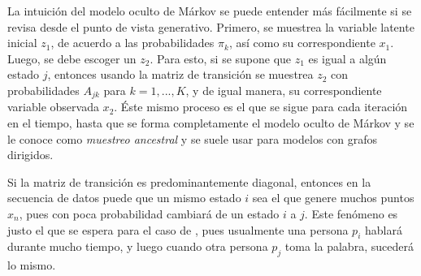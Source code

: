 La intuición del modelo oculto de Márkov se puede entender más fácilmente si se revisa desde el punto de vista generativo. Primero, se muestrea la variable latente inicial $z_1$, de acuerdo a las probabilidades $\pi_k$, así como su correspondiente $x_1$. Luego, se debe escoger un $z_2$. Para esto, si se supone que $z_1$ es igual a algún estado $j$, entonces usando la matriz de transición se muestrea $z_2$ con probabilidades $A_{jk}$ para $k = 1, ..., K$, y de igual manera, su correspondiente variable observada $x_2$. Éste mismo proceso es el que se sigue para cada iteración en el tiempo, hasta que se forma completamente el modelo oculto de Márkov y se le conoce como \textit{muestreo ancestral} y se suele usar para modelos con grafos dirigidos.

Si la matriz de transición es predominantemente diagonal, entonces en la secuencia de datos puede que un mismo estado $i$ sea el que genere muchos puntos $x_n$, pues con poca probabilidad cambiará de un estado $i$ a $j$. Este fenómeno es justo el que se espera para el caso de \sd, pues usualmente una persona $p_i$ hablará durante mucho tiempo, y luego cuando otra persona $p_j$ toma la palabra, sucederá lo mismo.